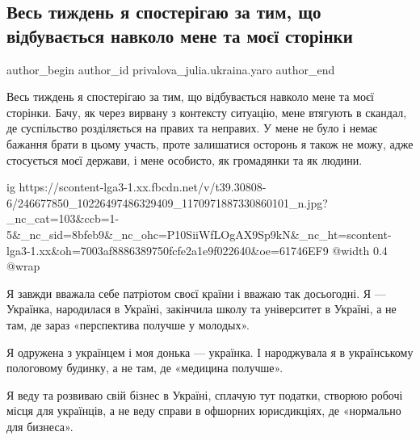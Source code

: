  
 
 
 
 
 
\subsection{Весь тиждень я спостерігаю за тим, що відбувається навколо мене та моєї сторінки}
\label{sec:18_10_2021.fb.privalova_julia.ukraina.yaro.1.stranichka_patriotizm}
 
\ifcmt
 author_begin
   author_id privalova_julia.ukraina.yaro
 author_end
\fi

Весь тиждень я спостерігаю за тим, що відбувається навколо мене та моєї
сторінки. Бачу, як через вирвану з контексту ситуацію, мене втягують в скандал,
де суспільство розділяється на правих та неправих. У мене не було і немає
бажання брати в цьому участь, проте залишатися осторонь я також не можу, адже
стосується моєї держави, і мене особисто, як громадянки та як людини.

\ifcmt
  ig https://scontent-lga3-1.xx.fbcdn.net/v/t39.30808-6/246677850_10226497486329409_1170971887330860101_n.jpg?_nc_cat=103&ccb=1-5&_nc_sid=8bfeb9&_nc_ohc=P10SiiWfLOgAX9Sp9kN&_nc_ht=scontent-lga3-1.xx&oh=7003af8886389750fcfe2a1e9f022640&oe=61746EF9
  @width 0.4
  @wrap 
\fi

Я завжди вважала себе патріотом своєї країни і вважаю так досьогодні. Я —
Українка, народилася в Україні, закінчила школу та університет в Україні, а не
там, де зараз «перспектива получше у молодых».

Я одружена з українцем і моя донька — українка. І народжувала я в українському
пологовому будинку, а не там, де «медицина получше».

Я веду та розвиваю свій бізнес в Україні, сплачую тут податки, створюю робочі
місця для українців, а не веду справи в офшорних юрисдикціях, де «нормально для
бизнеса».

